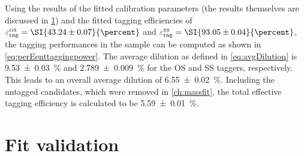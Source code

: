 Using the results of the fitted calibration parameters (the results themselves are discussed in \cref{sec:decTimeFitVal}) and the fitted tagging efficiencies of $\varepsilon_{\text{tag}}^{\text{\tiny OS}}=\SI{43.24\pm0.07}{\percent}$ and $\varepsilon_{\text{tag}}^{\text{\tiny SS}}=\SI{93.05\pm0.04}{\percent}$, the tagging performances in the sample can be computed as shown in \cref{eq:perEenttaggingpower}.
The average dilution  as defined in \cref{eq:avgDilution} is \SI{9.53\pm0.03}{\percent} and \SI{2.789\pm0.009}{\percent} for the OS and SS taggers, respectively.
This leads to an overall average dilution of \SI{6.55\pm0.02}{\percent}.
Including the untagged candidates, which were removed in \cref{ch:massfit}, the total effective tagging efficiency is calculated to be \SI{5.59\pm0.01}{\percent}.

\section{Fit validation}
\label{sec:decTimeFitVal}

